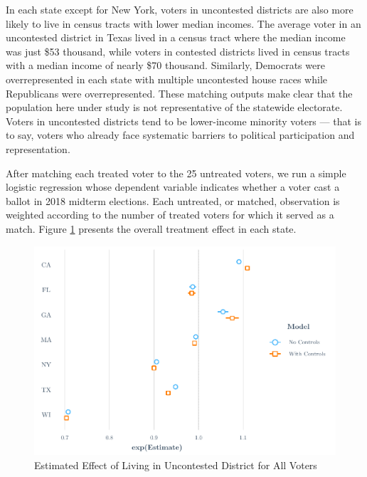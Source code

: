 \documentclass[
  12pt,
]{article}
\begin{document}
In each state except for New York, voters in uncontested districts are also more likely to live in census tracts with lower median incomes. The average voter in an uncontested district in Texas lived in a census tract where the median income was just \$53 thousand, while voters in contested districts lived in census tracts with a median income of nearly \$70 thousand. Similarly, Democrats were overrepresented in each state with multiple uncontested house races while Republicans were overrepresented. These matching outputs make clear that the population here under study is not representative of the statewide electorate. Voters in uncontested districts tend to be lower-income minority voters --- that is to say, voters who already face systematic barriers to political participation and representation.

After matching each treated voter to the 25 untreated voters, we run a simple logistic regression whose dependent variable indicates whether a voter cast a ballot in 2018 midterm elections. Each untreated, or matched, observation is weighted according to the number of treated voters for which it served as a match. Figure \ref{fig:overall-plots} presents the overall treatment effect in each state.

\begin{figure}[H]

{\centering \includegraphics{write_files/figure-latex/overall-plots-1} 

}

\caption{\label{fig:overall-plots}Estimated Effect of Living in Uncontested District for All Voters}\label{fig:overall-plots}
\end{figure}
\end{document}
